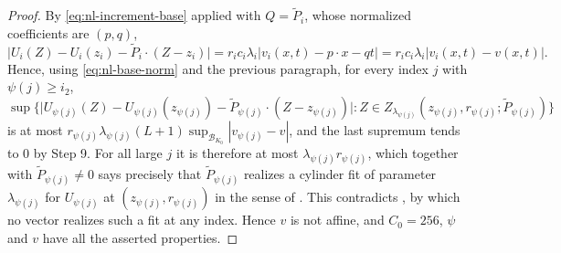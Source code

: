 \begin{proof}
By \eqref{eq:nl-increment-base} applied with $Q=\widetilde P_i$, whose
normalized coefficients are $(p,q)$,
\[
  \bigl|U_i(Z)-U_i(z_i)-\widetilde P_i\cdot(Z-z_i)\bigr|
   =r_ic_i\lambda_i\bigl|v_i(x,t)-p\cdot x-qt\bigr|
   =r_ic_i\lambda_i\bigl|v_i(x,t)-v(x,t)\bigr| .
\]
Hence, using \eqref{eq:nl-base-norm} and the previous paragraph, for every
index $j$ with $\psi(j)\ge i_2$,
\[
  \sup\bigl\{\bigl|U_{\psi(j)}(Z)-U_{\psi(j)}(z_{\psi(j)})
     -\widetilde P_{\psi(j)}\cdot(Z-z_{\psi(j)})\bigr|:
     Z\in Z_{\lambda_{\psi(j)}}(z_{\psi(j)},r_{\psi(j)};
        \widetilde P_{\psi(j)})\bigr\}
\]
is at most
$r_{\psi(j)}\lambda_{\psi(j)}(L+1)\sup_{\mathcal B_{K_0}}
  |v_{\psi(j)}-v|$,
and the last supremum tends to $0$ by Step 9. For all large $j$ it is therefore
at most $\lambda_{\psi(j)}r_{\psi(j)}$, which together with
$\widetilde P_{\psi(j)}\ne0$ says precisely that $\widetilde P_{\psi(j)}$
realizes a cylinder fit of parameter $\lambda_{\psi(j)}$ for $U_{\psi(j)}$ at
$(z_{\psi(j)},r_{\psi(j)})$ in the sense of . This
contradicts , by which no vector realizes such a fit at
any index. Hence $v$ is not affine, and $C_0=256$, $\psi$ and $v$ have all the
asserted properties.
\end{proof}
